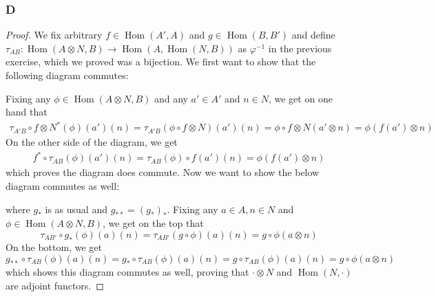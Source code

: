 \documentclass{article}
\DeclareMathOperator{\Hom}{\mathrm{Hom}}
\begin{document}
\subsubsection{D}\label{1.5.D}
\begin{proof}
    We fix arbitrary $f\in \Hom(A',A)$ and $g\in \Hom(B,B')$ and define \\$\tau_{AB}:\Hom(A\otimes N,B)\to \Hom(A, \Hom(N,B))$ as $\varphi^{-1}$ in the previous exercise, which we proved was a bijection. We first want to show that the following diagram commutes:
    \begin{center}
    \end{center}
    Fixing any $\phi \in \Hom(A\otimes N,B)$ and any $a'\in A'$ and $n\in N$, we get on one hand that
    \begin{align*}
        \tau_{A'B}\circ f\otimes N^*(\phi)(a')(n)=\tau_{A'B}(\phi \circ f\otimes N)(a')(n)=\phi\circ f\otimes N(a'\otimes n)=\phi(f(a')\otimes n)
    \end{align*}
    On the other side of the diagram, we get
    \begin{align*}
        f^*\circ \tau_{AB}(\phi)(a')(n)=\tau_{AB}(\phi)\circ f(a')(n)=\phi(f(a')\otimes n)
    \end{align*}
    which proves the diagram does commute. Now we want to show the below diagram commutes as well:
    \begin{center}
    \end{center}
    where $g_*$ is as usual and $g_{**}=(g_*)_*$. Fixing any $a\in A, n\in N$ and $\phi\in \Hom(A\otimes N,B)$, we get on the top that
    \[
    \tau_{AB'}\circ g_*(\phi)(a)(n)=\tau_{AB'}(g\circ \phi)(a)(n)=g\circ \phi(a\otimes n)
    \]
    On the bottom, we get
    \[
    g_{**}\circ \tau_{AB}(\phi)(a)(n)=g_*\circ \tau_{AB}(\phi)(a)(n)=g\circ \tau_{AB}(\phi)(a)(n)=g\circ \phi(a\otimes n)
    \]
    which shows this diagram commutes as well, proving that $\cdot \otimes N$ and $\Hom(N,\cdot)$ are adjoint functors.
\end{proof}
\end{document}
